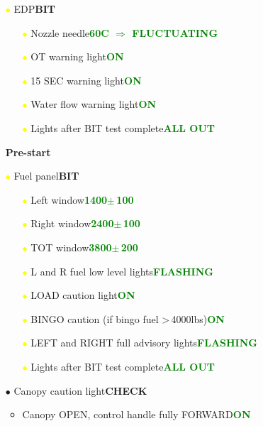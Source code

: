 \documentclass[a4paper,12pt,dvipsnames]{letter}
\newcommand{\button}[1]{\textbf{#1}}
\newcommand{\degC}{\textdegree{}C}
\newcommand{\ok}[1]{\textcolor{Green}{\textbf{#1}}}
\newcommand{\warn}[1]{\textcolor{Red}{\textbf{#1}}}
\newcommand{\bi}{\textcolor{ProcessBlue}{$\bullet$\;}}
\newcommand{\gi}{\textcolor{Green}{$\bullet$\;}}
\newcommand{\yi}{\textcolor{Yellow}{$\bullet$\;}}
\newcommand{\vi}{\textcolor{Plum}{$\bullet$\;}}
\begin{document}
{\begin{itemize}
\begin{itemize}
 \item[\vi] Depress airstart button\dotfill\warn{NO or REGULAR SOUND}
 \item[\gi] Manual fuel switch\dotfill\button{ON}
 \item[\vi] Depress airstart button\dotfill\warn{NO or REGULAR SOUND}
 \item[\gi] Manual fuel switch\dotfill\button{OFF}
\end{itemize}
\item[\yi] EDP\dotfill\button{BIT}
\begin{itemize}
 \item[\yi] Nozzle needle\dotfill\ok{60\degC{} $\Rightarrow$ FLUCTUATING}
 \item[\yi] OT warning light\dotfill\ok{ON}
 \item[\yi] 15 SEC warning light\dotfill\ok{ON}
 \item[\yi] Water flow warning light\dotfill\ok{ON}
 \item[\yi] Lights after BIT test complete\dotfill\ok{ALL OUT}
\end{itemize}
\end{itemize}
\newpage
\begin{itemize}
\item[] {\LARGE\textbf{Pre-start}}
\item[\yi] Fuel panel\dotfill\button{BIT}
\begin{itemize}
 \item[\yi] Left window\dotfill\ok{1400\;$\pm$\,100}
 \item[\yi] Right window\dotfill\ok{2400\;$\pm$\,100}
 \item[\yi] TOT window\dotfill\ok{3800\;$\pm$\,200}
 \item[\yi] L and R fuel low level lights\dotfill\ok{FLASHING}
 \item[\yi] LOAD caution light\dotfill\ok{ON}
 \item[\yi] BINGO caution (if bingo fuel >\,4000\;lbs)\dotfill\ok{ON}
 \item[\yi] LEFT and RIGHT full advisory lights\dotfill\ok{FLASHING}
 \item[\yi] Lights after BIT test complete\dotfill\ok{ALL OUT}
\end{itemize}
\item[\bi] Canopy caution light\dotfill\button{CHECK}
\begin{itemize}
 \item Canopy OPEN, control handle fully FORWARD\dotfill\ok{ON}

\end{itemize}
\end{itemize}}
\end{document}
